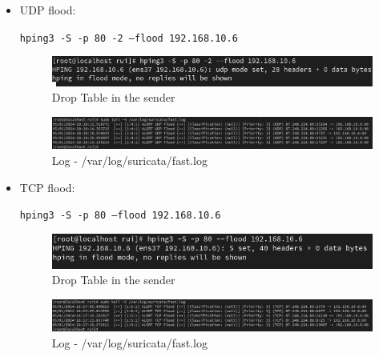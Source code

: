 \documentclass{article}
\begin{document}
\begin{itemize}
    \item UDP flood:\par
    \texttt{hping3 -S -p 80 -2 --flood 192.168.10.6}

    \texttt{}\par

\texttt{}\par
\begin{figure}[H]
    \centering
    \includegraphics[scale=0.5]{suricata/sur_DoS_udp_external.png}
    \caption{Drop Table in the sender}
    \label{fig:network-arc}
\end{figure}


\texttt{}\par
\begin{figure}[H]
    \centering
    \includegraphics[scale=0.45]{suricata/sur_DoS_udp_log.png}
    \caption{Log - /var/log/suricata/fast.log}
    \label{fig:network-arc}
\end{figure}


\item TCP flood:\par
\texttt{hping3 -S -p 80 --flood 192.168.10.6}
\texttt{}\par
\begin{figure}[H]
    \centering
    \includegraphics[scale=0.5]{suricata/sur_DoS_tcp_external.png}
    \caption{Drop Table in the sender}
    \label{fig:network-arc}
\end{figure}


\texttt{}\par
\begin{figure}[H]
    \centering
    \includegraphics[scale=0.45]{suricata/sur_DoS_tcp_log.png}
    \caption{Log - /var/log/suricata/fast.log}
    \label{fig:network-arc}
\end{figure}

\end{itemize}
\end{document}

